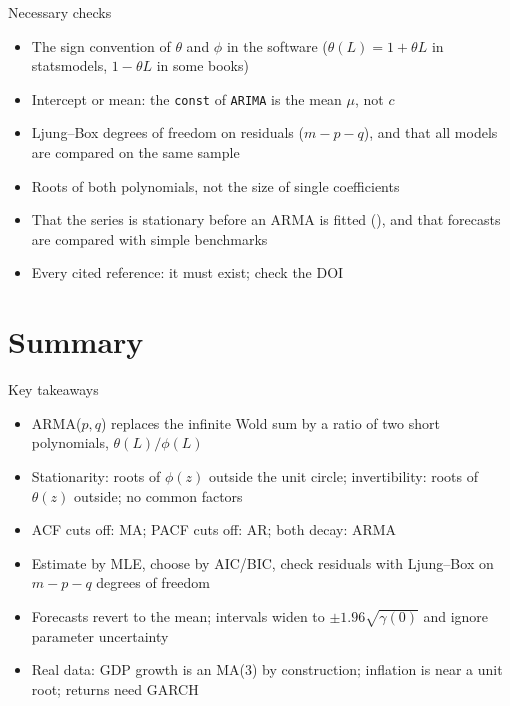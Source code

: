 \begin{frame}{Necessary checks}
\itemsize{\small}
\begin{itemize}
    \item The sign convention of $\theta$ and $\phi$ in the software ($\theta(L) = 1 + \theta L$ in statsmodels, $1 - \theta L$ in some books)
    \item Intercept or mean: the \texttt{const} of \texttt{ARIMA} is the mean $\mu$, not $c$
    \item Ljung--Box degrees of freedom on residuals ($m - p - q$), and that all models are compared on the same sample
    \item Roots of both polynomials, not the size of single coefficients
    \item That the series is stationary before an ARMA is fitted (), and that forecasts are compared with simple benchmarks
    \item Every cited reference: it must exist; check the DOI
\end{itemize}
\end{frame}


\section{Summary}

\begin{frame}{Key takeaways}
\itemsize{\small}
\begin{itemize}
    \item ARMA($p,q$) replaces the infinite Wold sum by a ratio of two short polynomials, $\theta(L)/\phi(L)$
    \item Stationarity: roots of $\phi(z)$ outside the unit circle; invertibility: roots of $\theta(z)$ outside; no common factors
    \item ACF cuts off: MA; PACF cuts off: AR; both decay: ARMA
    \item Estimate by MLE, choose by AIC/BIC, check residuals with Ljung--Box on $m - p - q$ degrees of freedom
    \item Forecasts revert to the mean; intervals widen to $\pm 1.96\sqrt{\gamma(0)}$ and ignore parameter uncertainty
    \item Real data: GDP growth is an MA(3) by construction; inflation is near a unit root; returns need GARCH
\end{itemize}
\end{frame}

